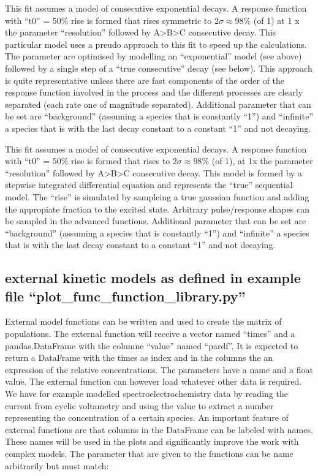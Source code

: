 \documentclass[letterpaper,10pt,english]{sphinxmanual}
\begin{document}
 This fit assumes a model of consecutive
exponential decays. A response function with “t0” = 50\(\%\) rise
is formed that rises symmetric to \(2\sigma \approx 98\%\) (of 1) at
1 x the parameter “resolution” followed by A\sphinxhyphen{}\textgreater{}B\sphinxhyphen{}\textgreater{}C consecutive decay.
This particular model uses a preudo approach to this fit to speed up the
calculations. The parameter are optimised by modelling an “exponential”
model (see above) followed by a single step of a “true consecutive”
decay (see below). This approach is quite representative unless there
are fast components of the order of the response function involved in
the process and the different processes are clearly separated (each rate
one of magnitude separated). Additional parameter that can be set are
“background” (assuming a species that is constantly “1”) and “infinite”
a species that is with the last decay constant to a constant “1” and not
decaying.

 This fit assumes a model of consecutive
exponential decays. A response function with “t0” = 50\(\%\) rise
is formed that rises to \(2\sigma \approx 98\%\) (of 1), at 1x the
parameter “resolution” followed by A\sphinxhyphen{}\textgreater{}B\sphinxhyphen{}\textgreater{}C consecutive decay. This model
is formed by a stepwise integrated differential equation and represents
the “true” sequential model. The “rise” is simulated by sampleing a true
gaussian function and adding the appropiate fraction to the excited
state. Arbitrary pulse/response shapes can be sampled in the advanced
functions. Additional parameter that can be set are “background”
(assuming a species that is constantly “1”) and “infinite” a species
that is with the last decay constant to a constant “1” and not decaying.


\subsection{external kinetic models as defined in example file “plot\_func\_function\_library.py”}
\label{\detokenize{Fitting:external-kinetic-models-as-defined-in-example-file-plot-func-function-library-py}}
External model functions can be written and used to create the matrix of
populations. The external function will receive a vector named “times”
and a pandas.DataFrame with the columne “value” named “pardf”. It is
expected to return a DataFrame with the times as index and in the
columns the an expression of the relative concentrations. The parameters
have a name and a float value. The external function can however load
whatever other data is required. We have for example modelled
spectro\sphinxhyphen{}electro\sphinxhyphen{}chemistry data by reading the current from cyclic
voltametry and using the value to extract a number representing the
concentration of a certain species. An important feature of external
functions are that columns in the DataFrame can be labeled with names.
These names will be used in the plots and significantly improve the work
with complex models. The parameter that are given to the functions can
be name arbitrarily but must match:
\end{document}
